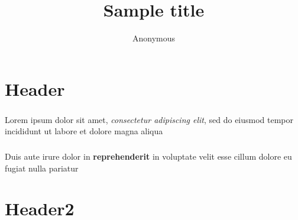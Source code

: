\documentclass{beamer}
\title{Sample title}
\author{Anonymous}
\begin{document}
\section{Header}
\begin{frame}
\frametitle{\insertsection}
Lorem ipsum dolor sit amet, \emph{consectetur adipiscing elit}, sed do eiusmod  tempor incididunt ut labore et dolore magna aliqua
\end{frame}
\begin{frame}
\frametitle{\insertsection}
Duis aute irure dolor in \textbf{reprehenderit} in voluptate  velit esse cillum dolore eu fugiat nulla pariatur
\end{frame}
\section{Header2}
\end{document}
